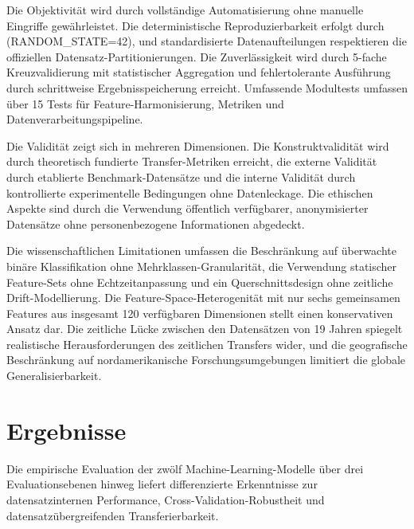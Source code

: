 \documentclass[11pt,a4paper]{article}
\begin{document}
    Die Objektivität wird durch vollständige Automatisierung ohne manuelle Eingriffe gewährleistet. Die deterministische Reproduzierbarkeit erfolgt durch (RANDOM\_STATE=42), und standardisierte Datenaufteilungen respektieren die offiziellen Datensatz-Partitionierungen. Die Zuverlässigkeit wird durch 5-fache Kreuzvalidierung mit statistischer Aggregation und fehlertolerante Ausführung durch schrittweise Ergebnisspeicherung erreicht. Umfassende Modultests umfassen über 15 Tests für Feature-Harmonisierung, Metriken und Datenverarbeitungspipeline.

    Die Validität zeigt sich in mehreren Dimensionen. Die Konstruktvalidität wird durch theoretisch fundierte Transfer-Metriken erreicht, die externe Validität durch etablierte Benchmark-Datensätze und die interne Validität durch kontrollierte experimentelle Bedingungen ohne Datenleckage. Die ethischen Aspekte sind durch die Verwendung öffentlich verfügbarer, anonymisierter Datensätze ohne personenbezogene Informationen abgedeckt.

    Die wissenschaftlichen Limitationen umfassen die Beschränkung auf überwachte binäre Klassifikation ohne Mehrklassen-Granularität, die Verwendung statischer Feature-Sets ohne Echtzeitanpassung und ein Querschnittsdesign ohne zeitliche Drift-Modellierung. Die Feature-Space-Heterogenität mit nur sechs gemeinsamen Features aus insgesamt 120 verfügbaren Dimensionen stellt einen konservativen Ansatz dar. Die zeitliche Lücke zwischen den Datensätzen von 19 Jahren spiegelt realistische Herausforderungen des zeitlichen Transfers wider, und die geografische Beschränkung auf nordamerikanische Forschungsumgebungen limitiert die globale Generalisierbarkeit.

    \section{Ergebnisse}

    Die empirische Evaluation der zwölf Machine-Learning-Modelle über drei Evaluationsebenen hinweg liefert differenzierte Erkenntnisse zur datensatzinternen Performance, Cross-Validation-Robustheit und datensatzübergreifenden Transferierbarkeit.
\end{document}
